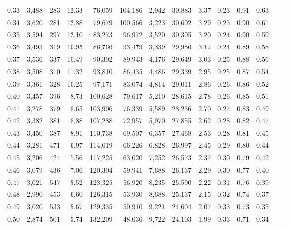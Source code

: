 \begin{tabular}{rrrrrrrrrrrrrr}
0.33 &  3,488 &  283 &   12.33 &   76,059 &  104,186 &   2,942 &  30,883 &  3.37 &  0.23 &  0.91 &      0.63 \\
0.34 &  3,620 &  281 &   12.88 &   79,679 &  100,566 &   3,223 &  30,602 &  3.29 &  0.23 &  0.90 &      0.61 \\
0.35 &  3,594 &  297 &   12.10 &   83,273 &   96,972 &   3,520 &  30,305 &  3.20 &  0.24 &  0.90 &      0.59 \\
0.36 &  3,493 &  319 &   10.95 &   86,766 &   93,479 &   3,839 &  29,986 &  3.12 &  0.24 &  0.89 &      0.58 \\
0.37 &  3,536 &  337 &   10.49 &   90,302 &   89,943 &   4,176 &  29,649 &  3.03 &  0.25 &  0.88 &      0.56 \\
0.38 &  3,508 &  310 &   11.32 &   93,810 &   86,435 &   4,486 &  29,339 &  2.95 &  0.25 &  0.87 &      0.54 \\
0.39 &  3,361 &  328 &   10.25 &   97,171 &   83,074 &   4,814 &  29,011 &  2.86 &  0.26 &  0.86 &      0.52 \\
0.40 &  3,457 &  396 &    8.73 &  100,628 &   79,617 &   5,210 &  28,615 &  2.78 &  0.26 &  0.85 &      0.51 \\
0.41 &  3,278 &  379 &    8.65 &  103,906 &   76,339 &   5,589 &  28,236 &  2.70 &  0.27 &  0.83 &      0.49 \\
0.42 &  3,382 &  381 &    8.88 &  107,288 &   72,957 &   5,970 &  27,855 &  2.62 &  0.28 &  0.82 &      0.47 \\
0.43 &  3,450 &  387 &    8.91 &  110,738 &   69,507 &   6,357 &  27,468 &  2.53 &  0.28 &  0.81 &      0.45 \\
0.44 &  3,281 &  471 &    6.97 &  114,019 &   66,226 &   6,828 &  26,997 &  2.45 &  0.29 &  0.80 &      0.44 \\
0.45 &  3,206 &  424 &    7.56 &  117,225 &   63,020 &   7,252 &  26,573 &  2.37 &  0.30 &  0.79 &      0.42 \\
0.46 &  3,079 &  436 &    7.06 &  120,304 &   59,941 &   7,688 &  26,137 &  2.29 &  0.30 &  0.77 &      0.40 \\
0.47 &  3,021 &  547 &    5.52 &  123,325 &   56,920 &   8,235 &  25,590 &  2.22 &  0.31 &  0.76 &      0.39 \\
0.48 &  2,990 &  453 &    6.60 &  126,315 &   53,930 &   8,688 &  25,137 &  2.15 &  0.32 &  0.74 &      0.37 \\
0.49 &  3,020 &  533 &    5.67 &  129,335 &   50,910 &   9,221 &  24,604 &  2.07 &  0.33 &  0.73 &      0.35 \\
0.50 &  2,874 &  501 &    5.74 &  132,209 &   48,036 &   9,722 &  24,103 &  1.99 &  0.33 &  0.71 &      0.34 \\

\end{tabular}
